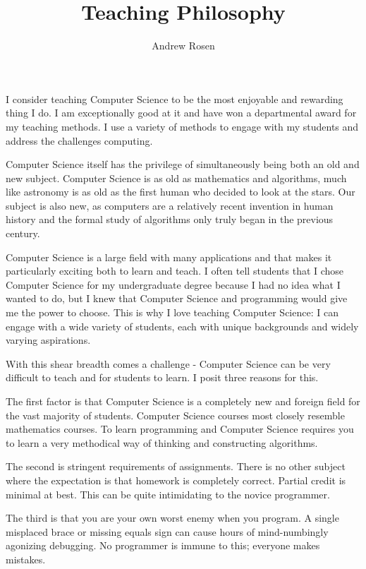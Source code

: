 \documentclass[10pt, a4paper]{article}
\author{Andrew Rosen}
\title{Teaching Philosophy}
\date{}
\begin{document}
\maketitle


I consider teaching Computer Science to be the most enjoyable and rewarding thing I do.
I am exceptionally good at it and have won a departmental award for my teaching methods.
I use a variety of methods to engage with my students and address the challenges computing.





Computer Science itself has the privilege of simultaneously being both an old and new subject.
Computer Science is as old as mathematics and algorithms, much like astronomy is as old as the first human who decided to look at the stars.
Our subject is also new, as computers are a relatively recent invention in human history and the formal study of algorithms only truly began in the previous century.


Computer Science is a large field with many applications and that makes it particularly exciting both to learn and teach.
I often tell students that I chose Computer Science for my undergraduate degree because I had no idea what I wanted to do, but I knew that Computer Science and programming would give me the power to choose.
This is why I love teaching Computer Science:  I can engage with a wide variety of students, each with unique backgrounds and widely varying aspirations.

With this shear breadth comes a challenge - Computer Science can be very difficult to teach and for students to learn.
I posit three reasons for this.

The first factor is that Computer Science is a completely new and foreign field for the vast majority of students.
Computer Science courses most closely resemble mathematics courses. %
To learn programming and Computer Science requires you to learn a very methodical way of thinking and constructing algorithms. %

The second is stringent requirements of assignments.
There is no other subject where the expectation is that homework is completely correct.
Partial credit is minimal at best.
This can be quite intimidating to the novice programmer.

The third is that you are your own worst enemy when you program.
A single misplaced brace or missing equals sign can cause hours of mind-numbingly agonizing debugging.
No programmer is immune to this; everyone makes mistakes.
\end{document}
